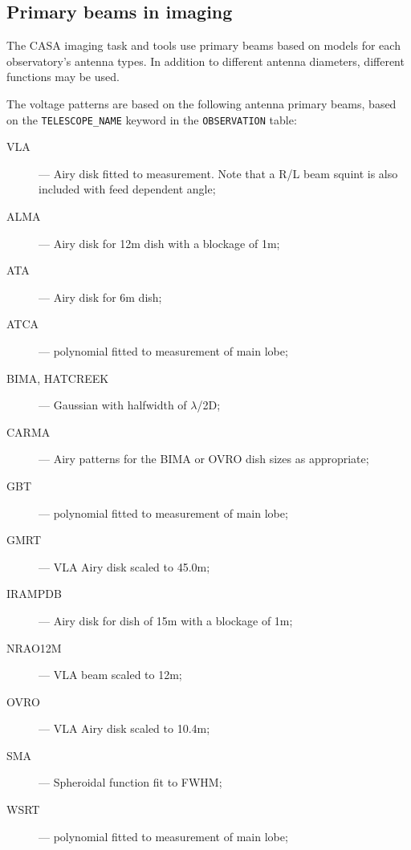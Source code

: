 \subsection{Primary beams in imaging }
\label{section:im.pars.pb}

The CASA imaging task and tools use primary beams based on models
for each observatory's antenna types.  In addition to different 
antenna diameters, different functions may be used.  

The voltage patterns are based on the following antenna primary beams,
based on the {\tt TELESCOPE\_NAME} keyword in the {\tt OBSERVATION}
table:
\begin{description}
\item[VLA] --- Airy disk fitted to measurement. Note that a R/L beam
squint is also included with feed dependent angle;

\item[ALMA] --- Airy disk for 12m dish with a blockage of 1m;

\item[ATA] --- Airy disk for 6m dish;

\item[ATCA] --- polynomial fitted to measurement of main lobe;

\item[BIMA, HATCREEK] --- Gaussian with halfwidth of $\lambda$/2D;

\item[CARMA] --- Airy patterns for the BIMA or OVRO dish sizes as appropriate;

\item[GBT] --- polynomial fitted to measurement of main lobe;

\item[GMRT] --- VLA Airy disk scaled to 45.0m;

\item[IRAMPDB] --- Airy disk for dish of 15m with a blockage of 1m;

\item[NRAO12M] ---  VLA beam scaled to 12m;

\item[OVRO] --- VLA Airy disk scaled to 10.4m;

\item[SMA] --- Spheroidal function fit to FWHM;

\item[WSRT] --- polynomial fitted to measurement of main lobe;

\end{description}

